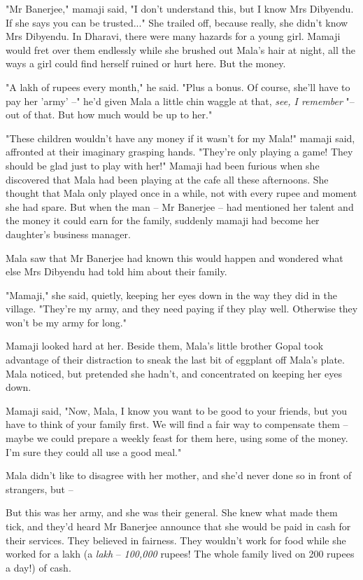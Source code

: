 "Mr Banerjee," mamaji said, "I don't understand this, but I know
Mrs Dibyendu. If she says you can be trusted..." She trailed off,
because really, she didn't know Mrs Dibyendu. In Dharavi, there
were many hazards for a young girl. Mamaji would fret over them
endlessly while she brushed out Mala's hair at night, all the ways
a girl could find herself ruined or hurt here. But the money.

"A lakh of rupees every month," he said. "Plus a bonus. Of course,
she'll have to pay her 'army' --" he'd given Mala a little chin
waggle at that, \emph{see, I remember} "-- out of that. But how
much would be up to her."

"These children wouldn't have any money if it wasn't for my Mala!"
mamaji said, affronted at their imaginary grasping hands. "They're
only playing a game! They should be glad just to play with her!"
Mamaji had been furious when she discovered that Mala had been
playing at the cafe all these afternoons. She thought that Mala
only played once in a while, not with every rupee and moment she
had spare. But when the man -- Mr Banerjee -- had mentioned her
talent and the money it could earn for the family, suddenly mamaji
had become her daughter's business manager.

Mala saw that Mr Banerjee had known this would happen and wondered
what else Mrs Dibyendu had told him about their family.

"Mamaji," she said, quietly, keeping her eyes down in the way they
did in the village. "They're my army, and they need paying if they
play well. Otherwise they won't be my army for long."

Mamaji looked hard at her. Beside them, Mala's little brother Gopal
took advantage of their distraction to sneak the last bit of
eggplant off Mala's plate. Mala noticed, but pretended she hadn't,
and concentrated on keeping her eyes down.

Mamaji said, "Now, Mala, I know you want to be good to your
friends, but you have to think of your family first. We will find a
fair way to compensate them -- maybe we could prepare a weekly
feast for them here, using some of the money. I'm sure they could
all use a good meal."

Mala didn't like to disagree with her mother, and she'd never done
so in front of strangers, but --

But this was her army, and she was their general. She knew what
made them tick, and they'd heard Mr Banerjee announce that she
would be paid in cash for their services. They believed in
fairness. They wouldn't work for food while she worked for a lakh
(a \emph{lakh} -- \emph{100,000} rupees! The whole family lived on
200 rupees a day!) of cash.

